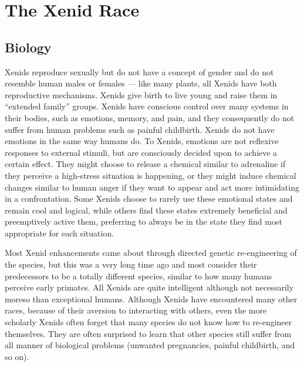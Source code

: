 \documentclass[blue]{guildcamp1}
\begin{document}
\name{\bAlienRace{}}

\section*{The Xenid Race}


\subsection*{Biology}

Xenids reproduce sexually but do not have a concept of gender and do not resemble human males or females --- like many plants, all Xenids have both reproductive mechanisms. Xenids give birth to live young and raise them in ``extended family'' groups. Xenids have conscious control over many systems in their bodies, such as emotions, memory, and pain, and they consequently do not suffer from human problems such as painful childbirth. Xenids do not have emotions in the same way humans do. To Xenids, emotions are not reflexive responses to external stimuli, but are consciously decided upon to achieve a certain effect. They might choose to release a chemical similar to adrenaline if they perceive a high-stress situation is happening, or they might induce chemical changes similar to human anger if they want to appear and act more intimidating in a confrontation. Some Xenids choose to rarely use these emotional states and remain cool and logical, while others find these states extremely beneficial and preemptively active them, preferring to always be in the state they find most appropriate for each situation.

Most Xenid enhancements came about through directed genetic re-engineering of the species, but this was a very long time ago and most consider their predecessors to be a totally different species, similar to how many humans perceive early primates. All Xenids are quite intelligent although not necessarily moreso than exceptional humans. Although Xenids have encountered many other races, because of their aversion to interacting with others, even the more scholarly Xenids often forget that many species do not know how to re-engineer themselves. They are often surprised to learn that other species still suffer from all manner of biological problems (unwanted pregnancies, painful childbirth, and so on).
\end{document}
